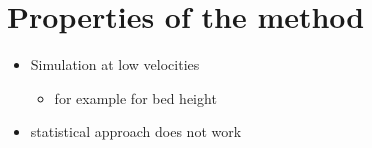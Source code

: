\chapter{Properties of the \MP method}
\label{ch:PropertiesMP}
\begin{itemize}
    \item Simulation at low velocities
    \begin{itemize}
        \item for example for bed height
    \end{itemize}
    \item statistical approach does not work
\end{itemize}